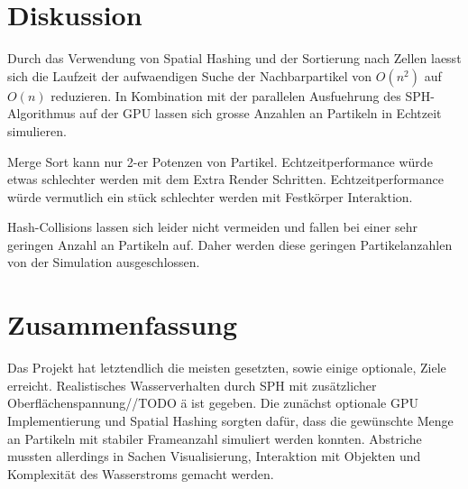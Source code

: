 \documentclass[a4paper]{paper}
\begin{document}
\section{Diskussion}
Durch das Verwendung von Spatial Hashing und der Sortierung nach Zellen laesst sich die Laufzeit der aufwaendigen Suche der Nachbarpartikel von $O(n^2)$ auf $O(n)$ reduzieren.
In Kombination mit der parallelen Ausfuehrung des SPH-Algorithmus auf der GPU lassen sich grosse Anzahlen an Partikeln in Echtzeit simulieren.


Merge Sort kann nur 2-er Potenzen von Partikel.
Echtzeitperformance würde etwas schlechter werden mit dem Extra Render Schritten.
Echtzeitperformance würde vermutlich ein stück schlechter werden mit Festkörper Interaktion. 

Hash-Collisions lassen sich leider nicht vermeiden und fallen bei einer sehr geringen Anzahl an Partikeln auf. Daher werden diese geringen Partikelanzahlen von der Simulation ausgeschlossen.
\section{Zusammenfassung}
Das Projekt hat letztendlich die meisten gesetzten, sowie einige optionale, Ziele erreicht. Realistisches Wasserverhalten durch SPH mit zusätzlicher Oberflächenspannung//TODO ä ist gegeben. Die zunächst optionale GPU Implementierung und Spatial Hashing sorgten dafür, dass die gewünschte Menge an Partikeln mit stabiler Frameanzahl simuliert werden konnten. Abstriche mussten allerdings in Sachen Visualisierung, Interaktion mit Objekten und Komplexität des Wasserstroms gemacht werden.





\end{document}
